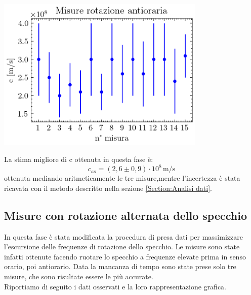 \documentclass{article}
\begin{document}
\begin{table}[H]
\begin{minipage}{0.65\linewidth}
                    \centering
                    \includegraphics[width=10cm]{../images/CCW.png}
                    \label{fig:c_CCW}

                \end{minipage}
                
            \end{table}

            La stima migliore di c ottenuta in questa fase è: \[ c_{ao} = (2,6 \pm 0,9) \cdot 10^8 \, \mathrm{m/s} \] 
            ottenuta mediando aritmeticamente le tre misure,mentre l'incertezza è stata ricavata con il metodo descritto nella sezione \ref{Section:Analisi dati}.
         
        
        \subsection{Misure con rotazione alternata dello specchio}

            In questa fase è stata modificata la procedura di presa dati per massimizzare l'escursione delle frequenze di rotazione dello specchio. 
            Le misure sono state infatti ottenute facendo ruotare lo specchio a frequenze elevate prima in senso orario, poi antiorario. 
            Data la mancanza di tempo sono state prese solo tre misure, che sono risultate essere le più accurate. \\
            
            Riportiamo di seguito i dati osservati e la loro rappresentazione grafica.
            
\end{document}
